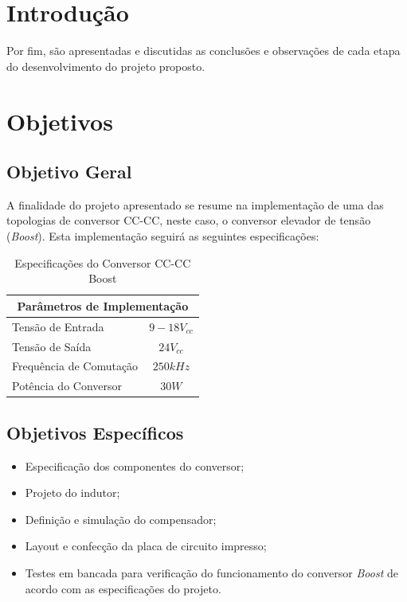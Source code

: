 \documentclass[a4paper]{article}
\begin{document}
{\Large
\tableofcontents
\cleardoublepage

\Large
\section{Introdução}

Por fim, são apresentadas e discutidas as conclusões e observações de cada etapa do desenvolvimento do projeto proposto.

\section{Objetivos}

\subsection{Objetivo Geral}
\Large
A finalidade do projeto apresentado se resume na implementação de uma das topologias de conversor CC-CC, neste caso, o conversor elevador de tensão (\textit{Boost}). Esta implementação seguirá as seguintes especificações:

\begin{table}[H] \large
\centering
\caption{Especificações do Conversor CC-CC Boost}
\label{tab1}
\begin{tabular}{lc}
\multicolumn{2}{c}{\textbf{Parâmetros de Implementação}}     \\
\hline
Tensão de Entrada       & $9-18V_{cc}$ \\
Tensão de Saída         & $24V_{cc}$   \\
Frequência de Comutação & $250kHz$        \\
Potência do Conversor   & $30W$ \\ \hline
\end{tabular}
\end{table}

\subsection{Objetivos Específicos}

\begin{itemize}
\item Especificação dos componentes do conversor;
\item Projeto do indutor;
\item Definição e simulação do compensador;
\item Layout e confecção da placa de circuito impresso;
\item Testes em bancada para verificação do funcionamento do conversor \textit{Boost} de acordo com as especificações do projeto.
\end{itemize}

}
\end{document}
